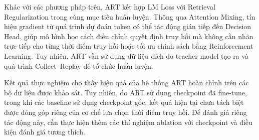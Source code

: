 Khác với các phương pháp trên, ART kết hợp LM Loss với Retrieval Regularization trong cùng mục tiêu huấn luyện. Thông qua Attention Mixing, tín hiệu gradient từ quá trình dự đoán token có thể tác động gián tiếp đến Decision Head, giúp mô hình học cách điều chỉnh quyết định truy hồi mà không cần nhãn trực tiếp cho từng thời điểm truy hồi hoặc tối ưu chính sách bằng Reinforcement Learning. Tuy nhiên, ART vẫn sử dụng dữ liệu đích do teacher model tạo ra và quá trình Collect–Replay để tổ chức huấn luyện.

Kết quả thực nghiệm cho thấy hiệu quả của hệ thống ART hoàn chỉnh trên các bộ dữ liệu được khảo sát. Tuy nhiên, do ART sử dụng checkpoint đã fine-tune, trong khi các baseline sử dụng checkpoint gốc, kết quả hiện tại chưa tách biệt được đóng góp riêng của cơ chế lựa chọn thời điểm truy hồi. Để đánh giá riêng tác động này, cần thực hiện thêm các thí nghiệm ablation với checkpoint và điều kiện đánh giá tương thích.
